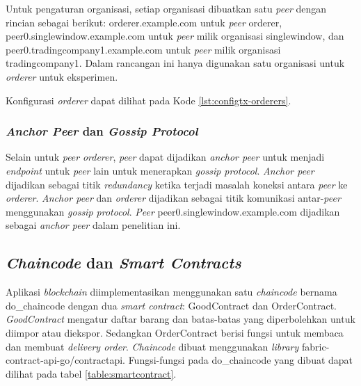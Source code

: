 Untuk pengaturan organisasi, setiap organisasi dibuatkan satu \textit{peer} dengan rincian sebagai berikut: orderer.example.com untuk \textit{peer} orderer, peer0.singlewindow.example.com untuk \textit{peer} milik organisasi singlewindow, dan peer0.tradingcompany1.example.com untuk \textit{peer} milik organisasi tradingcompany1. Dalam rancangan ini hanya digunakan satu organisasi untuk \textit{orderer} untuk eksperimen.

Konfigurasi \textit{orderer} dapat dilihat pada Kode \ref{lst:configtx-orderers}. 



\subsubsection{\textit{Anchor Peer} dan \textit{Gossip Protocol}}
\label{subsubsec:anchor-peer}
Selain untuk \textit{peer} \textit{orderer}, \textit{peer} dapat dijadikan \textit{anchor peer} untuk menjadi \textit{endpoint} untuk \textit{peer} lain untuk menerapkan \textit{gossip protocol}. \textit{Anchor peer} dijadikan sebagai titik \textit{redundancy} ketika terjadi masalah koneksi antara \textit{peer} ke \textit{orderer}. \textit{Anchor peer} dan \textit{orderer} dijadikan sebagai titik komunikasi antar-\textit{peer} menggunakan \textit{gossip protocol}. \textit{Peer} peer0.singlewindow.example.com dijadikan sebagai \textit{anchor peer} dalam penelitian ini. 

\subsection{\textit{Chaincode} dan \textit{Smart Contracts}}
\label{subsec:chaincode}
Aplikasi \textit{blockchain} diimplementasikan menggunakan satu \textit{chaincode} bernama do\_chaincode dengan dua \textit{smart contract}: GoodContract dan OrderContract. \textit{GoodContract} mengatur daftar barang dan batas-batas yang diperbolehkan untuk diimpor atau diekspor. Sedangkan OrderContract berisi fungsi untuk membaca dan membuat \textit{delivery order}. \textit{Chaincode} dibuat menggunakan \textit{library} fabric-contract-api-go/contractapi. Fungsi-fungsi pada do\_chaincode yang dibuat dapat dilihat pada tabel \ref{table:smartcontract}. 

